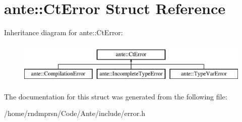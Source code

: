 \hypertarget{structante_1_1CtError}{}\section{ante\+:\+:Ct\+Error Struct Reference}
\label{structante_1_1CtError}
Inheritance diagram for ante\+:\+:Ct\+Error\+:\begin{figure}[H]
\begin{center}
\leavevmode
\includegraphics[height=2.000000cm]{structante_1_1CtError}
\end{center}
\end{figure}


The documentation for this struct was generated from the following file\+:\begin{DoxyCompactItemize}
\item 
/home/rndmprsn/\+Code/\+Ante/include/error.\+h\end{DoxyCompactItemize}
